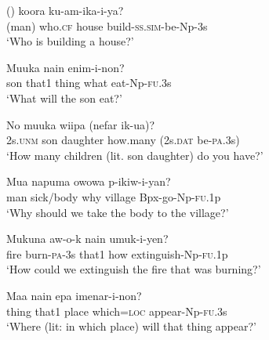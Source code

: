 \ea%
\label{ex:x1167}
\gll ()    koora  ku-am-ika-i-ya? \\
  (man)  who.\textsc{cf}  house  build-\textsc{ss}.\textsc{sim}-be-Np-3s    \\
\glt `Who is building a house?'
\z





\ea%
\label{ex:x1166}
\gll Muuka  nain      enim-i-non? \\
son  that1  thing  what  eat-Np-\textsc{fu}.3s  \\
\glt `What will the son eat?'
\z





\ea%
\label{ex:x1164}
\gll No  muuka  wiipa    (nefar  ik-ua)? \\
2s.\textsc{unm}  son  daughter  how.many  (2s.\textsc{dat}  be-\textsc{pa}.3s)\\
\glt `How many children (lit. son daughter) do you have?'
\z





\ea%
\label{ex:x1165}
\gll Mua  napuma    owowa  p-ikiw-i-yan? \\
man  sick/body  why  village  Bpx-go-Np-\textsc{fu}.1p  \\
\glt `Why should we take the body to the village?'
\z





\ea%
\label{ex:x1378}
\gll Mukuna  aw-o-k  nain    umuk-i-yen? \\
fire  burn-\textsc{pa}-3s  that1  how  extinguish-Np-\textsc{fu}.1p      \\
\glt `How could we extinguish the fire that was burning?'
\z





\ea%
\label{ex:x1173}
\gll Maa  nain  epa    imenar-i-non? \\
thing  that1  place  which=\textsc{loc}  appear-Np-\textsc{fu}.3s      \\
\glt `Where (lit: in which place) will that thing appear?'
\z





